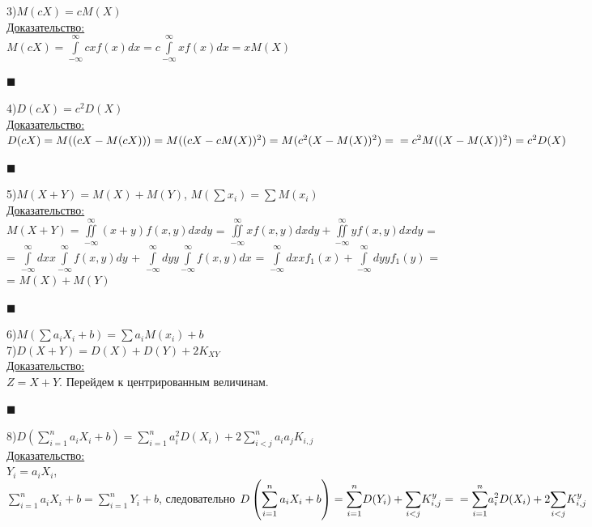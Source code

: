 \documentclass[russian, 12pt, fleqn]{article}
\begin{document}
3)$M(cX) = cM(X)$\\
\underline{Доказательство:}\\
$M(cX) = \displaystyle{\int\limits_{-\infty} ^{\infty}} c x f(x) dx = c \displaystyle{\int \limits_{-\infty} ^{\infty}} x f(x) dx = xM(X)$
\begin{flushright}\(\blacksquare\)\end{flushright}
4)$D(cX) = c^2 D(X)$\\
\underline{Доказательство:}\\
$D(cX)=M((cX - M(cX))) = M((cX - c M(X))^2) = M(c^2(X-M(X))^2) =\\= c^2M((X-M(X))^2) = c^2 D(X)$
\begin{flushright}\(\blacksquare\)\end{flushright}
5)$M(X+Y) = M(X) + M(Y)$,  $M(\sum x_i) = \sum M(x_i)$\\
\underline{Доказательство:}\\
$M(X + Y) =  \displaystyle{\iint \limits_{-\infty} ^{\infty}} (x+y)f(x,y) dxdy$ = $\displaystyle{\iint \limits_{-\infty} ^{\infty}} xf(x,y) dxdy + \displaystyle{\iint \limits_{-\infty} ^{\infty}} yf(x,y) dxdy$ =\\= $\displaystyle{\int\limits_{-\infty}^{\infty} } dx x \displaystyle{\int\limits_{-\infty}^{\infty} } f(x, y) dy $ +  $\displaystyle{\int\limits_{-\infty}^{\infty} } dy y \displaystyle{\int\limits_{-\infty}^{\infty} } f(x, y) dx $ = $\displaystyle{\int\limits_{-\infty}^{\infty} } dx x f_1(x) + \displaystyle{\int\limits_{-\infty}^{\infty} } dyy f_1(y)$ =\\= $M(X) + M(Y)$
\begin{flushright}\(\blacksquare\)\end{flushright}
6)$M(\sum \limits a_i X_i + b) = \sum \limits a_i M(x_i) + b$\\
7)$D(X + Y) = D(X) + D(Y) + 2 K_{XY}$\\
\underline{Доказательство:}\\
$Z=X+Y$. Перейдем к центрированным величинам.
\begin{flushright}\(\blacksquare\)\end{flushright}
8)$\displaystyle{D\left (\sum_{i = 1}^{n}a_iX_i + b\right )} =  \displaystyle{\sum_{i = 1}^{n}}  a_i^2 D(X_i) + 2 \displaystyle{\sum_{i <j}^{n}}a_ia_jK_{i,j}$\\
\underline{Доказательство:}\\
$Y_i = a_i X_i$,\\
 $ \displaystyle{\sum_{i = 1}^{n}}a_iX_i + b =  \displaystyle{\sum_{i = 1}^{n}}Y_i + b$, следовательно  $\displaystyle{D\left (\sum_{i = 1}^{n}a_iX_i + b\right )}  = \displaystyle{\sum_{i = 1}^{n}} D(Y_i) + \displaystyle{\sum_{i < j}^{}} K_{i,j} ^y =\\= \displaystyle{\sum_{i = 1}^{n}}a_i^2D(X_i) + 2 \displaystyle{\sum_{i  < j}} K_{i,j}^{y}$
\end{document}
